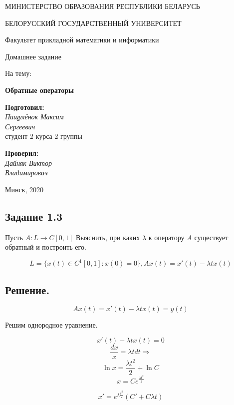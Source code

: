 \documentclass[a4paper, 12pt]{report}
\begin{document}
\begin{titlepage}
    
    \bigskip
    \centerline{\large МИНИСТЕРСТВО ОБРАЗОВАНИЯ РЕСПУБЛИКИ БЕЛАРУСЬ}
    \bigskip
    \centerline{\large БЕЛОРУССКИЙ ГОСУДАРСТВЕННЫЙ УНИВЕРСИТЕТ}
    \bigskip
    \centerline{\large Факультет прикладной математики и информатики}
    \vfill
    \vfill
    \vfill
    \centerline{\LARGE Домашнее задание}
    \bigskip
    \bigskip
    \centerline{\large На тему:}
    \centerline{\large \bf \sc Обратные операторы}
    \bigskip
    \vfill
    \vfill
    \hfill
    \begin{minipage}{0.3\textwidth}
        {\large{\bf Подготовил:} \\
        {\it Пищулёнок Максим \\ Сергеевич}\\
        {студент 2 курса 2 группы}}
    \end{minipage}
    \vfill
    \hfill
    \begin{minipage}{0.3\textwidth}
      {\large{\bf Проверил:} \\
    {\it Дайняк Виктор \\ Владимирович}}
    \end{minipage}
    \vfill
    \vfill
    \centerline{\large Минск, 2020}
\end{titlepage}
  


\subsection*{Задание 1.3}
Пусть $A : L \to C[0, 1]$ Выяснить, при каких $\lambda$ к оператору $A$ существует обратный
и построить его.

\[ L = \{ x(t) \in C^1[0, 1]: x(0) = 0\}, Ax(t) = x'(t) - \lambda tx(t)\]

\subsection*{Решение.}

\[A x(t) = x'(t) - \lambda t x(t) = y(t)\]

Решим однородное уравнение.

\[x'(t) - \lambda t x(t) = 0\]
\[\frac{dx}{x} = \lambda t dt \Rightarrow\]
\[\ln x = \frac{\lambda t^2}{2} + \ln C\]
\[x = C e^{ \frac{\lambda t^2}{2}}\]

\[x' = e^{\lambda \frac{t^2}{2}} (C' + C \lambda t)\]
\end{document}

